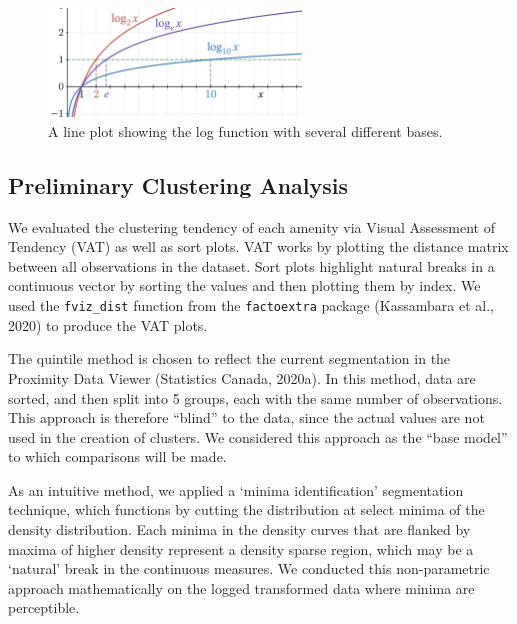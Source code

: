 \documentclass[11pt, a4paper]{article}
\begin{document}
\begin{figure}[H]
\centering
\includegraphics[width=0.6\textwidth]{./distributions/logtransform.png}
\caption[Log-transform]{A line plot showing the log function with several different bases.}\label{logtransform}
\end{figure}







\subsection{Preliminary Clustering Analysis}


We evaluated the clustering tendency of each amenity via Visual Assessment of Tendency (VAT) as well as sort plots. VAT works by plotting the distance matrix between all observations in the dataset. Sort plots highlight natural breaks in a continuous vector by sorting the values and then plotting them by index. We used the \texttt{fviz\_dist} function from the \texttt{factoextra} package (Kassambara et al., 2020) to produce the VAT plots.
\par
The quintile method is chosen to reflect the current segmentation in the Proximity Data Viewer (Statistics Canada, 2020a). In this method, data are sorted, and then split into 5 groups, each with the same number of observations.  This approach is  therefore ``blind'' to the data, since the actual values are not used in the creation of clusters. We considered this approach as the ``base model'' to which comparisons will be made.
\par
As an intuitive method, we applied a ‘minima identification’ segmentation technique, which functions by cutting the distribution at select minima of the density distribution. Each minima in the density curves that are flanked by maxima of higher density represent a density sparse region, which may be a ‘natural’ break in the continuous measures. We conducted this non-parametric approach mathematically on the logged transformed data where minima are perceptible.
\end{document}
